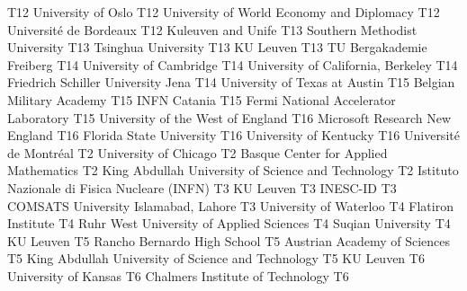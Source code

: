 \begin{multicols}{2}
{T12}
{}
{University of Oslo}
{T12}
{}
{University of World Economy and Diplomacy}
{T12}
{}
{Université de Bordeaux}
{T12}
{}
{Kuleuven and Unife}
{T13}
{}
{Southern Methodist University}
{T13}
{}
{Tsinghua University}
{T13}
{}
{KU Leuven}
{T13}
{}
{TU Bergakademie Freiberg}
{T14}
{}
{University of Cambridge}
{T14}
{}
{University of California, Berkeley}
{T14}
{}
{Friedrich Schiller University Jena}
{T14}
{}
{University of Texas at Austin}
{T15}
{}
{Belgian Military Academy}
{T15}
{}
{INFN Catania}
{T15}
{}
{Fermi National Accelerator Laboratory}
{T15}
{}
{University of the West of England}
{T16}
{}
{Microsoft Research New England}
{T16}
{}
{Florida State University}
{T16}
{}
{University of Kentucky}
{T16}
{}
{Université de Montréal}
{T2}
{}
{University of Chicago}
{T2}
{}
{Basque Center for Applied Mathematics}
{T2}
{}
{King Abdullah University of Science and Technology}
{T2}
{}
{Istituto Nazionale di Fisica Nucleare (INFN)}
{T3}
{}
{KU Leuven}
{T3}
{}
{INESC-ID}
{T3}
{}
{COMSATS University Islamabad, Lahore}
{T3}
{}
{University of Waterloo}
{T4}
{}
{Flatiron Institute}
{T4}
{}
{Ruhr West University of Applied Sciences}
{T4}
{}
{Suqian University}
{T4}
{}
{KU Leuven}
{T5}
{}
{Rancho Bernardo High School}
{T5}
{}
{Austrian Academy of Sciences}
{T5}
{}
{King Abdullah University of Science and Technology}
{T5}
{}
{KU Leuven}
{T6}
{}
{University of Kansas}
{T6}
{}
{Chalmers Institute of Technology}
{T6}
{}

\end{multicols}
